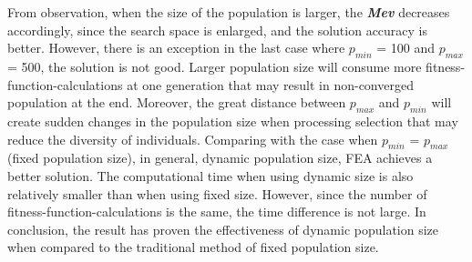 \documentclass[final]{elsarticle}
\begin{document}
From observation, when the size of the population is larger, the \textit{\textbf{Mev}} decreases accordingly, since the search space is enlarged, and the solution accuracy is better. However, there is an exception in the last case where $p_{min}$ = 100 and $p_{max}$ = 500, the solution is not good. Larger population size will consume more fitness-function-calculations at one generation that may result in non-converged population at the end. Moreover, the great distance between \textbf{$p_{max}$} and $p_{min}$ will create sudden changes in the population size when processing selection that may reduce the diversity of individuals. Comparing with the case when $p_{min} $ = $ p_{max} $ (fixed population size), in general, dynamic population size, FEA achieves a better solution. The computational time when using dynamic size is also relatively smaller than when using fixed size. However, since the number of fitness-function-calculations is the same, the time difference is not large. In conclusion, the result has proven the effectiveness of dynamic population size when compared to the traditional method of fixed population size. 
%
\end{document}
